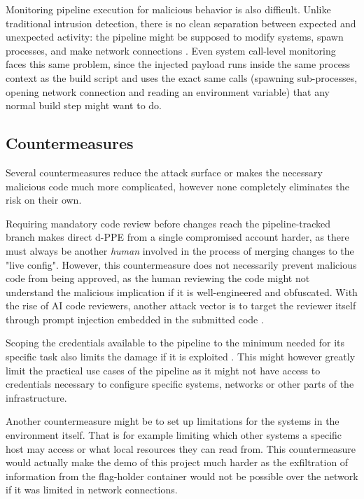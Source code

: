 \documentclass{article}
\begin{document}
Monitoring pipeline execution for malicious behavior is also difficult. Unlike traditional intrusion detection, there is no clean separation between expected and unexpected activity: the pipeline might be supposed to modify systems, spawn processes, and make network connections \cite{owaspPPE}. Even system call-level monitoring faces this same problem, since the injected payload runs inside the same process context as the build script and uses the exact same calls (spawning sub-processes, opening network connection and reading an environment variable) that any normal build step might want to do.

\subsection{Countermeasures}

Several countermeasures reduce the attack surface or makes the necessary malicious code much more complicated, however none completely eliminates the risk on their own. 

Requiring mandatory code review before changes reach the pipeline-tracked branch makes direct d-PPE from a single compromised account harder, as there must always be another \textit{human} involved in the process of merging changes to the "live config". However, this countermeasure does not necessarily prevent malicious code from being approved, as the human reviewing the code might not understand the malicious implication if it is well-engineered and obfuscated. With the rise of AI code reviewers, another attack vector is to target the reviewer itself through prompt injection embedded in the submitted code \cite{owaspLLM01}.

Scoping the credentials available to the pipeline to the minimum needed for its specific task also limits the damage if it is exploited \cite{owaspPPE5}. This might however greatly limit the practical use cases of the pipeline as it might not have access to credentials necessary to configure specific systems, networks or other parts of the infrastructure. 

Another countermeasure might be to set up limitations for the systems in the environment itself. That is for example limiting which other systems a specific host may access or what local resources they can read from. This countermeasure would actually make the demo of this project much harder as the exfiltration of information from the flag-holder container would not be possible over the network if it was limited in network connections. 
\end{document}
